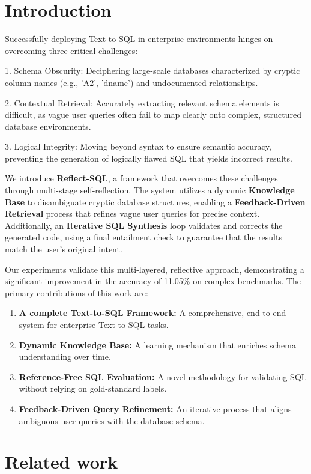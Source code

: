 \documentclass[runningheads]{llncs}
\begin{document}
\section{Introduction}
Successfully deploying Text-to-SQL in enterprise environments hinges on overcoming three critical challenges:

1. Schema Obscurity: Deciphering large-scale databases characterized by cryptic column names (e.g., 'A2', 'dname') and undocumented relationships.

2. Contextual Retrieval: Accurately extracting relevant schema elements is difficult, as vague user queries often fail to map clearly onto complex, structured database environments.

3. Logical Integrity: Moving beyond syntax to ensure semantic accuracy, preventing the generation of logically flawed SQL that yields incorrect results.

We introduce \textbf{Reflect-SQL}, a framework that overcomes these challenges through multi-stage self-reflection. The system utilizes a dynamic \textbf{Knowledge Base} to disambiguate cryptic database structures, enabling a \textbf{Feedback-Driven Retrieval} process that refines vague user queries for precise context. Additionally, an \textbf{Iterative SQL Synthesis} loop validates and corrects the generated code, using a final entailment check to guarantee that the results match the user's original intent.

Our experiments validate this multi-layered, reflective approach, demonstrating a significant improvement in the accuracy of 11.05\% on complex benchmarks. The primary contributions of this work are:
\begin{enumerate}
    \item \textbf{A complete Text-to-SQL Framework:} A comprehensive, end-to-end system for enterprise Text-to-SQL tasks.

    \item \textbf{Dynamic Knowledge Base:} A learning mechanism that enriches schema understanding over time.

    \item \textbf{Reference-Free SQL Evaluation:} A novel methodology for validating SQL without relying on gold-standard labels.

    \item \textbf{Feedback-Driven Query Refinement:} An iterative process that aligns ambiguous user queries with the database schema.
\end{enumerate}
\section{Related work}
\end{document}
